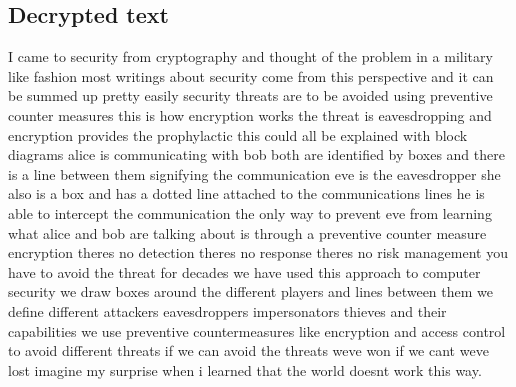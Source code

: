 \subsection{Decrypted text}

I came to security from cryptography and thought of the problem in a military like fashion most writings about security come from this perspective and it can be summed up pretty easily security threats are to be avoided using preventive counter measures this is how encryption works the threat is eavesdropping and encryption provides the prophylactic this could all be explained with block diagrams alice is communicating with bob both are identified by boxes and there is a line between them signifying the communication eve is the eavesdropper she also is a box and has a dotted line attached to the communications lines he is able to intercept the communication the only way to prevent eve from learning what alice and bob are talking about is through a preventive counter measure encryption theres no detection theres no response theres no risk management you have to avoid the threat for decades we have used this approach to computer security we draw boxes around the different players and lines between them we define different attackers eavesdroppers impersonators thieves and their capabilities we use preventive countermeasures like encryption and access control to avoid different threats if we can avoid the threats weve won if we cant weve lost imagine my surprise when i learned that the world doesnt work this way.



